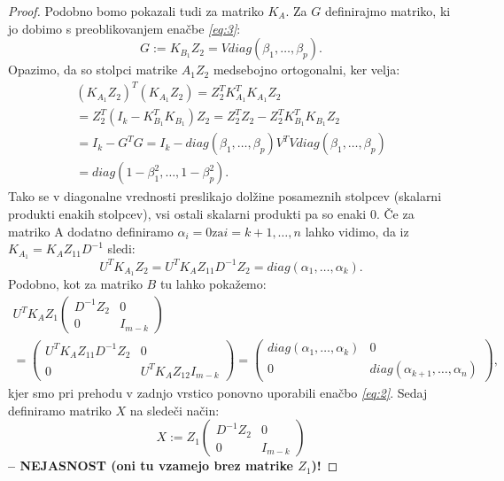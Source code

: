 \documentclass[mat1]{article}
\begin{document}
\begin{proof}
Podobno bomo pokazali tudi za matriko $K_A$. Za $G$ definirajmo matriko, ki jo dobimo s preoblikovanjem enačbe \textit{\eqref{eq:3}}:
$$ G := K_{B_1} Z_2 = V diag(\beta_1, \ldots, \beta_p) \text{.}
$$
Opazimo, da so stolpci matrike $A_1 Z_2$ medsebojno ortogonalni, ker velja:
\begin{gather*}
(K_{A_1} Z_2)^T (K_{A_1} Z_2) = Z_2^T K_{A_1}^T K_{A_1} Z_2 \\
= Z_2^T (I_{k} - K_{B_1}^T K_{B_1}) Z_2 = Z_2^T Z_2 -  Z_2^T K_{B_1}^T K_{B_1} Z_2 \\
= I_k - G^T G = I_k - diag(\beta_1, \ldots, \beta_p) V^T V diag(\beta_1, \ldots, \beta_p) \\
= diag(1 - \beta_1^2, \ldots,1 - \beta_p^2) \text{.}
\end{gather*}
Tako se v diagonalne vrednosti preslikajo dolžine posameznih stolpcev (skalarni produkti enakih stolpcev), vsi ostali skalarni produkti pa so enaki 0. Če za matriko A dodatno definiramo $\alpha_i = 0 \text{za} i = k+1, \ldots, n$ lahko vidimo, da iz $K_{A_1} = K_A Z_{11} D^{-1}$ sledi:
$$ U^T K_{A_1} Z_2 = U^T K_A Z_{11} D^{-1} Z_2 = diag(\alpha_1, \ldots, \alpha_k) \text{.}
$$ 
Podobno, kot za matriko $B$ tu lahko pokažemo:
\begin{gather*}
U^T K_A Z_1 
\begin{pmatrix}
D^{-1} Z_2 & 0\\ 
0 & I_{m-k}
\end{pmatrix} \\
=
\begin{pmatrix}
U^T K_A Z_{11} D^{-1} Z_2 & 0\\ 
0 & U^T K_A Z_{12} I_{m-k}
\end{pmatrix} =
\begin{pmatrix}
diag(\alpha_1, \ldots, \alpha_k) & 0\\ 
0 & diag(\alpha_{k+1}, \ldots, \alpha_n)
\end{pmatrix} \text{,}
\end{gather*}
kjer smo pri prehodu v zadnjo vrstico ponovno uporabili enačbo \textit{\eqref{eq:2}}. Sedaj definiramo matriko $X$ na sledeči način:
$$ X := Z_1 
\begin{pmatrix}
D^{-1} Z_2 & 0\\ 
0 & I_{m-k}
\end{pmatrix}
$$ \textbf{-- NEJASNOST (oni tu vzamejo brez matrike $Z_1$)!}
\end{proof}
\end{document}
